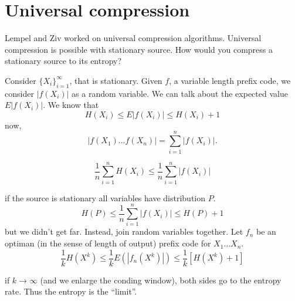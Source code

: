 \section{Universal compression}
Lempel and Ziv worked on universal compression algorithms. Universal compression is possible with stationary source. How would you compress a stationary source to its entropy?

Consider $\{X_i\}_{i=1}^\infty$, that is stationary. Given $f$, a variable length prefix code, we consider $|f(X_i)|$ as a random variable. We can talk about the expected value $E|f(X_i)|$. We know that
\[
 H(X_i) \leq E|f(X_i)| \leq H(X_i) + 1
\]
now,
\[
|f(X_1)\ldots f(X_n)| = \sum_{i=1}^n|f(X_i)|. 
\]

\[
 \dfrac{1}{n}\sum_{i=1}^n H(X_i) \leq\dfrac{1}{n}\sum_{i=1}^n |f(X_i)|
\]

if the source is stationary all variables have distribution $P$.
\[
 H(P) \leq \dfrac{1}{n} \sum_{i = 1}^n |f(X_i)| \leq H(P) + 1
\]
but we didn't get far. Instead, join random variables together. Let $f_n$ be an optiman (in the sense of length of output) prefix code for $X_1 \ldots X_n$.
\[
 \dfrac{1}{k}H(X^k) \leq \dfrac{1}{k}E(|f_n(X^k)|) \leq \dfrac{1}{k}[H(X^k) + 1]
\]

if $k \rightarrow \infty$ (and we enlarge the conding window), both sides go to the entropy rate. Thus the entropy is the ``limit''.
